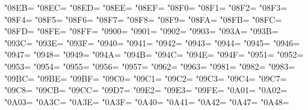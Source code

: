 \XeTeXcharclass"08EB=\KclassCM
\XeTeXcharclass"08EC=\KclassCM
\XeTeXcharclass"08ED=\KclassCM
\XeTeXcharclass"08EE=\KclassCM
\XeTeXcharclass"08EF=\KclassCM
\XeTeXcharclass"08F0=\KclassCM
\XeTeXcharclass"08F1=\KclassCM
\XeTeXcharclass"08F2=\KclassCM
\XeTeXcharclass"08F3=\KclassCM
\XeTeXcharclass"08F4=\KclassCM
\XeTeXcharclass"08F5=\KclassCM
\XeTeXcharclass"08F6=\KclassCM
\XeTeXcharclass"08F7=\KclassCM
\XeTeXcharclass"08F8=\KclassCM
\XeTeXcharclass"08F9=\KclassCM
\XeTeXcharclass"08FA=\KclassCM
\XeTeXcharclass"08FB=\KclassCM
\XeTeXcharclass"08FC=\KclassCM
\XeTeXcharclass"08FD=\KclassCM
\XeTeXcharclass"08FE=\KclassCM
\XeTeXcharclass"08FF=\KclassCM
\XeTeXcharclass"0900=\KclassCM
\XeTeXcharclass"0901=\KclassCM
\XeTeXcharclass"0902=\KclassCM
\XeTeXcharclass"0903=\KclassCM
\XeTeXcharclass"093A=\KclassCM
\XeTeXcharclass"093B=\KclassCM
\XeTeXcharclass"093C=\KclassCM
\XeTeXcharclass"093E=\KclassCM
\XeTeXcharclass"093F=\KclassCM
\XeTeXcharclass"0940=\KclassCM
\XeTeXcharclass"0941=\KclassCM
\XeTeXcharclass"0942=\KclassCM
\XeTeXcharclass"0943=\KclassCM
\XeTeXcharclass"0944=\KclassCM
\XeTeXcharclass"0945=\KclassCM
\XeTeXcharclass"0946=\KclassCM
\XeTeXcharclass"0947=\KclassCM
\XeTeXcharclass"0948=\KclassCM
\XeTeXcharclass"0949=\KclassCM
\XeTeXcharclass"094A=\KclassCM
\XeTeXcharclass"094B=\KclassCM
\XeTeXcharclass"094C=\KclassCM
\XeTeXcharclass"094E=\KclassCM
\XeTeXcharclass"094F=\KclassCM
\XeTeXcharclass"0951=\KclassCM
\XeTeXcharclass"0952=\KclassCM
\XeTeXcharclass"0953=\KclassCM
\XeTeXcharclass"0954=\KclassCM
\XeTeXcharclass"0955=\KclassCM
\XeTeXcharclass"0956=\KclassCM
\XeTeXcharclass"0957=\KclassCM
\XeTeXcharclass"0962=\KclassCM
\XeTeXcharclass"0963=\KclassCM
\XeTeXcharclass"0981=\KclassCM
\XeTeXcharclass"0982=\KclassCM
\XeTeXcharclass"0983=\KclassCM
\XeTeXcharclass"09BC=\KclassCM
\XeTeXcharclass"09BE=\KclassCM
\XeTeXcharclass"09BF=\KclassCM
\XeTeXcharclass"09C0=\KclassCM
\XeTeXcharclass"09C1=\KclassCM
\XeTeXcharclass"09C2=\KclassCM
\XeTeXcharclass"09C3=\KclassCM
\XeTeXcharclass"09C4=\KclassCM
\XeTeXcharclass"09C7=\KclassCM
\XeTeXcharclass"09C8=\KclassCM
\XeTeXcharclass"09CB=\KclassCM
\XeTeXcharclass"09CC=\KclassCM
\XeTeXcharclass"09D7=\KclassCM
\XeTeXcharclass"09E2=\KclassCM
\XeTeXcharclass"09E3=\KclassCM
\XeTeXcharclass"09FE=\KclassCM
\XeTeXcharclass"0A01=\KclassCM
\XeTeXcharclass"0A02=\KclassCM
\XeTeXcharclass"0A03=\KclassCM
\XeTeXcharclass"0A3C=\KclassCM
\XeTeXcharclass"0A3E=\KclassCM
\XeTeXcharclass"0A3F=\KclassCM
\XeTeXcharclass"0A40=\KclassCM
\XeTeXcharclass"0A41=\KclassCM
\XeTeXcharclass"0A42=\KclassCM
\XeTeXcharclass"0A47=\KclassCM
\XeTeXcharclass"0A48=\KclassCM
